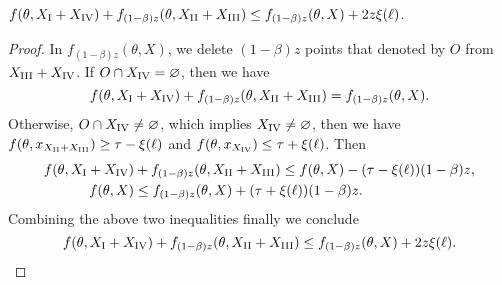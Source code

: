 \begin{lemma}
	\label{lemma-5}
	$f(\theta,X_\mathrm{\Rnum{1}}+X_\mathrm{\Rnum{4}})+ f_{(1-\beta)z}(\theta,X_\mathrm{\Rnum{2}}+X_\mathrm{\Rnum{3}})
		\leq f_{(1-\beta)z}(\theta,X)+2z\xi(\ell)$.
 \end{lemma}
\begin{proof}
	In $ f_{(1-\beta)z}(\theta,X) $, we delete $ (1-\beta)z $ points that denoted by $ O $ from $ X_\mathrm{\Rnum{3}}+X_\mathrm{\Rnum{4}} $.
	If $ O\cap X_\mathrm{\Rnum{4}}=\varnothing $, then we have \[ f(\theta,X_\mathrm{\Rnum{1}}+X_\mathrm{\Rnum{4}})+ f_{(1-\beta)z}(\theta,X_\mathrm{\Rnum{2}}+X_\mathrm{\Rnum{3}})= f_{(1-\beta)z}(\theta,X).\]
	Otherwise, $ O\cap X_\mathrm{\Rnum{4}}\ne \varnothing $, which implies $ X_\mathrm{\Rnum{4}}\ne \varnothing $, then we have $ f(\theta,x_{X_\mathrm{\Rnum{2}}+X_\mathrm{\Rnum{3}}})\geq \tau-\xi(\ell) $ and $ f(\theta,x_{X_\mathrm{\Rnum{4}}})\leq \tau+\xi(\ell) $. Then 
	\begin{align*}
	    f(\theta,X_\mathrm{\Rnum{1}}+X_\mathrm{\Rnum{4}})&+ f_{(1-\beta)z}(\theta,X_\mathrm{\Rnum{2}}+X_\mathrm{\Rnum{3}})\leq f(\theta,X)-(\tau-\xi(\ell))(1-\beta)z,\\
	    f(\theta,X)&\leq f_{(1-\beta)z}(\theta,X)+(\tau+\xi(\ell))(1-\beta)z.
	\end{align*}
	Combining the above two inequalities finally we conclude 
	\[ f(\theta,X_\mathrm{\Rnum{1}}+X_\mathrm{\Rnum{4}})+ f_{(1-\beta)z}(\theta,X_\mathrm{\Rnum{2}}+X_\mathrm{\Rnum{3}})\leq f_{(1-\beta)z}(\theta,X)+2z\xi(\ell). \]
\end{proof}

